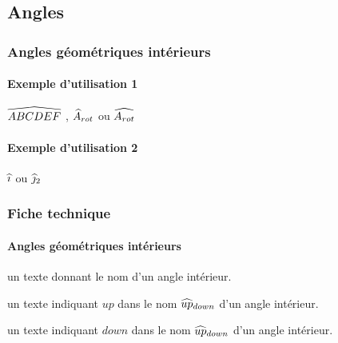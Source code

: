 \documentclass[12pt,a4paper]{article}
\begin{document}

\subsection{Angles}

\subsubsection{Angles géométriques \og intérieurs \fg}

\paragraph{Exemple d'utilisation 1}

\begin{latexex}
$\anglein{ABCDEF}$ ,
$\anglein*{A}{rot}$ ou
$\anglein{A_{rot}}$
\end{latexex}




\paragraph{Exemple d'utilisation 2}

\begin{latexex}
$\anglein{i}$ ou
$\anglein*{j}{2}$
\end{latexex}




\subsubsection{Fiche technique}

\paragraph{Angles géométriques \og intérieurs \fg}


\IDarg{} un texte donnant le nom d'un angle intérieur.


\separation



 un texte indiquant $up$ dans le nom $\anglein*{up}{down}$ d'un angle intérieur.

 un texte indiquant $down$ dans le nom $\anglein*{up}{down}$ d'un angle intérieur.
\end{document}

